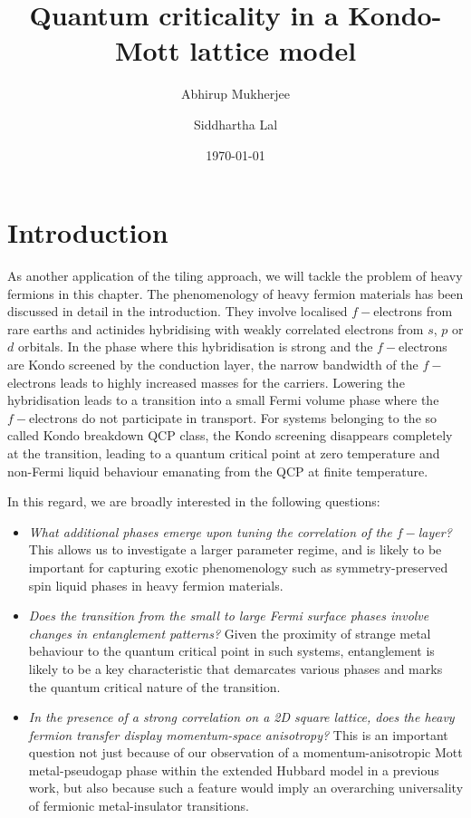 \documentclass[%
reprint,
superscriptaddress,
groupedaddress,
superscriptaddress,
onecolumn,
10pt
]{revtex4-2}
\begin{document}
\title{Quantum criticality in a Kondo-Mott lattice model}

\author{Abhirup Mukherjee}
\author{Siddhartha Lal}

\date{\today}

\maketitle
\section{Introduction}
As another application of the tiling approach, we will tackle the problem of heavy fermions in this chapter. The phenomenology of heavy fermion materials has been discussed in detail in the introduction. They involve localised \(f-\)electrons from rare earths and actinides hybridising with weakly correlated electrons from \(s\), \(p\) or \(d\) orbitals. In the phase where this hybridisation is strong and the \(f-\)electrons are Kondo screened by the conduction layer, the narrow bandwidth of the \(f-\)electrons leads to highly increased masses for the carriers. Lowering the hybridisation leads to a transition into a small Fermi volume phase where the \(f-\)electrons do not participate in transport. For systems belonging to the so called Kondo breakdown QCP class, the Kondo screening disappears completely at the transition, leading to a quantum critical point at zero temperature and non-Fermi liquid behaviour emanating from the QCP at finite temperature. 

In this regard, we are broadly interested in the following questions:
\begin{itemize}
	\item {\it What additional phases emerge upon tuning the correlation of the \(f-\)layer?} This allows us to investigate a larger parameter regime, and is likely to be important for capturing exotic phenomenology such as symmetry-preserved spin liquid phases in heavy fermion materials.
	\item {\it Does the transition from the small to large Fermi surface phases involve changes in entanglement patterns?} Given the proximity of strange metal behaviour to the quantum critical point in such systems, entanglement is likely to be a key characteristic that demarcates various phases and marks the quantum critical nature of the transition.
	\item {\it In the presence of a strong correlation on a 2D square lattice, does the heavy fermion transfer display momentum-space anisotropy?} This is an important question not just because of our observation of a momentum-anisotropic Mott metal-pseudogap phase within the extended Hubbard model in a previous work, but also because such a feature would imply an overarching universality of fermionic metal-insulator transitions.
\end{itemize}
\end{document}
